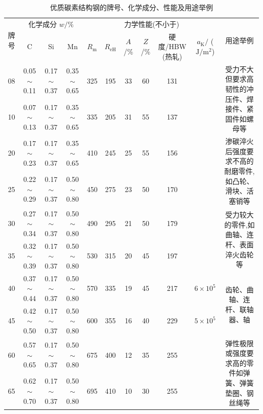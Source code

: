 \documentclass[UTF8]{ctexbook}
\newcommand{\◎}{\ensuremath{\bigcirc}}
\begin{document}
\begin{table}[H]
\centering
\caption{优质碳素结构钢的牌号、化学成分、性能及用途举例}
\label{tab:4-2}
\footnotesize\setlength{\tabcolsep}{3pt}
\begin{tabular}{|c|c|c|c|c|c|c|c|c|c|c|}
\hline
\multirow{2}{*}{牌号} & \multicolumn{3}{c|}{化学成分 $w/\%$} & \multicolumn{6}{c|}{力学性能(不小于)} & \multirow{2}{*}{用途举例} \\
\cline{2-10}
 & C & Si & Mn & $R_{\text{m}}$ & $R_{\text{eH}}$ & \makecell{$A$\\/\%} & \makecell{$Z$\\/\%} & \makecell{硬度/HBW\\(热轧)} & \makecell{$a_{\text{K}}/$\\($\text{J}/\text{m}^2$)} & \\
\hline
08 & 0.05$\sim$0.11 & 0.17$\sim$0.37 & 0.35$\sim$0.65 & 325 & 195 & 33 & 60 & 131 & & \multirow{2}{4cm}{受力不大但要求高韧性的冲压件、焊接件、紧固件如螺母等} \\
10 & 0.07$\sim$0.13 & 0.17$\sim$0.37 & 0.35$\sim$0.65 & 335 & 205 & 31 & 55 & 137 & & \\
\hline
20 & 0.17$\sim$0.23 & 0.17$\sim$0.37 & 0.35$\sim$0.65 & 410 & 245 & 25 & 55 & 156 & & \multirow{2}{4cm}{渗碳淬火后强度要求不高的耐磨零件,如凸轮、滑块、活塞销等} \\
25 & 0.22$\sim$0.29 & 0.17$\sim$0.37 & 0.50$\sim$0.80 & 450 & 275 & 23 & 50 & 170 & & \\
\hline
30 & 0.27$\sim$0.34 & 0.17$\sim$0.37 & 0.50$\sim$0.80 & 490 & 295 & 21 & 50 & 179 & & \multirow{2}{4cm}{受力较大的零件,如曲轴、连杆、表面淬火齿轮等} \\
35 & 0.32$\sim$0.39 & 0.17$\sim$0.37 & 0.50$\sim$0.80 & 530 & 315 & 20 & 45 & 197 & & \\
\hline
40 & 0.37$\sim$0.44 & 0.17$\sim$0.37 & 0.50$\sim$0.80 & 570 & 335 & 19 & 45 & 217 & $6\times 10^5$ & \multirow{2}{4cm}{齿轮、曲轴、连杆、联轴器、轴} \\
45 & 0.42$\sim$0.50 & 0.17$\sim$0.37 & 0.50$\sim$0.80 & 600 & 355 & 16 & 40 & 229 & $5\times 10^5$ & \\
\hline
60 & 0.57$\sim$0.65 & 0.17$\sim$0.37 & 0.50$\sim$0.80 & 675 & 400 & 12 & 35 & 255 & & \multirow{2}{4cm}{弹性极限或强度要求高的零件如弹簧、弹簧垫圈、钢丝绳等} \\
65 & 0.62$\sim$0.70 & 0.17$\sim$0.37 & 0.50$\sim$0.80 & 695 & 410 & 10 & 30 & 255 & & \\
\hline
\end{tabular}\end{table}
\end{document}
